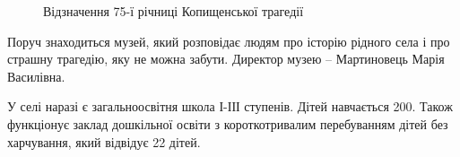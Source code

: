 \begin{figure}
\begin{subfigure}[b]{0.3\textwidth}
		\caption{}
		\label{fig:mouse}
		\end{subfigure}
	\caption{\label{fig:frog4}Відзначення 75-ї річниці Копищенської трагедії}\label{fig:animals}
\end{figure}

Поруч знаходиться музей, який розповідає людям про історію рідного села і про страшну трагедію, яку не можна забути. Директор музею – Мартиновець Марія Василівна.

У селі наразі є загальноосвітня школа І-ІІІ ступенів.  Дітей навчається 200. Також функціонує заклад дошкільної освіти з короткотривалим перебуванням дітей без харчування, який відвідує 22 дітей.





